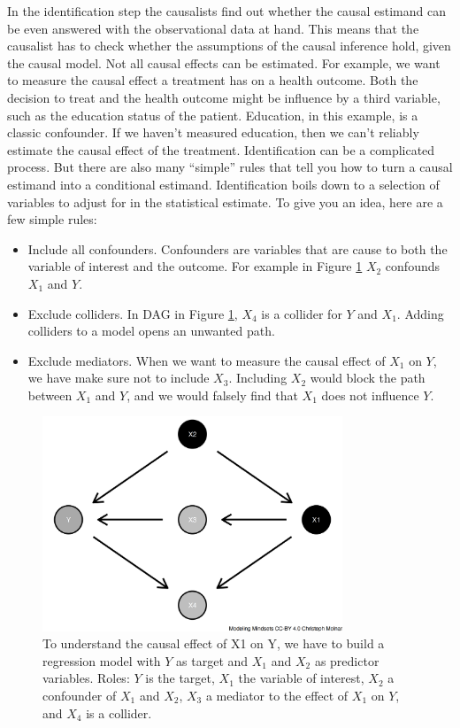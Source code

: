 \documentclass[
  10pt,
]{scrbook}
\providecommand{\tightlist}{%
  \setlength{\itemsep}{0pt}\setlength{\parskip}{0pt}}
\begin{document}
In the identification step the causalists find out whether the causal estimand can be even answered with the observational data at hand.
This means that the causalist has to check whether the assumptions of the causal inference hold, given the causal model.
Not all causal effects can be estimated.
For example, we want to measure the causal effect a treatment has on a health outcome.
Both the decision to treat and the health outcome might be influence by a third variable, such as the education status of the patient.
Education, in this example, is a classic confounder.
If we haven't measured education, then we can't reliably estimate the causal effect of the treatment.
Identification can be a complicated process.
But there are also many ``simple'' rules that tell you how to turn a causal estimand into a conditional estimand.
Identification boils down to a selection of variables to adjust for in the statistical estimate.
To give you an idea, here are a few simple rules:

\begin{itemize}
\tightlist
\item
  Include all confounders. Confounders are variables that are cause to both the variable of interest and the outcome. For example in Figure \ref{fig:dag-rules} \(X_2\) confounds \(X_1\) and \(Y\).
\item
  Exclude colliders. In DAG in Figure \ref{fig:dag-rules}, \(X_4\) is a collider for \(Y\) and \(X_1\). Adding colliders to a model opens an unwanted path.
\item
  Exclude mediators. When we want to measure the causal effect of \(X_1\) on \(Y\), we have make sure not to include \(X_3\). Including \(X_2\) would block the path between \(X_1\) and \(Y\), and we would falsely find that \(X_1\) does not influence \(Y\).
\end{itemize}

\begin{figure}

{\centering \includegraphics[width=0.8\textwidth]{figures/dag-rules-1} 

}

\caption{To understand the causal effect of X1 on Y, we have to build a regression model with $Y$ as target and $X_1$ and $X_2$ as predictor variables. Roles: $Y$ is the target, $X_1$ the variable of interest, $X_2$ a confounder of $X_1$ and $X_2$, $X_3$ a mediator to the effect of $X_1$ on $Y$, and $X_4$ is a collider.}\label{fig:dag-rules}
\end{figure}
\end{document}
